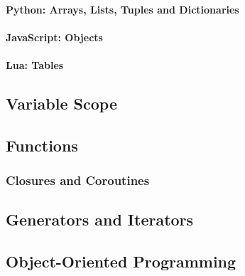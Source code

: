 \paragraph{Python: Arrays, Lists, Tuples and Dictionaries}

\paragraph{JavaScript: Objects}

\paragraph{Lua: Tables}

\subsection{Variable Scope}
\label{varscope}

\subsection{Functions}
\subsubsection{Closures and Coroutines}
\label{closures}

\subsection{Generators and Iterators}

\subsection{Object-Oriented Programming}
\label{oop}
